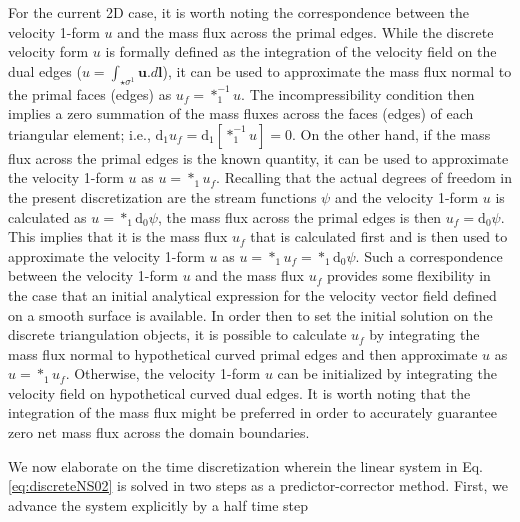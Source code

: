 \documentclass[final,12pt,times]{elsarticle}
\begin{document}
For the current 2D case, it is worth noting the correspondence between the velocity 1-form $u$ and the mass flux across the primal edges. While the discrete velocity form $u$ is formally defined as the integration of the velocity field on the dual edges ($u=\int_{\star \sigma^1} \mathbf{u} . d \mathbf{l}$), it can be used to approximate the mass flux normal to the primal faces (edges) as $u_f = \ast_1^{-1} u$. The incompressibility condition then implies a zero summation of the mass fluxes across the faces (edges) of each triangular element; i.e., $\textrm{d}_1 u_f = \textrm{d}_1 [\ast^{-1}_1 u ] = 0$. On the other hand, if the mass flux across the primal edges is the known quantity, it can be used to approximate the velocity 1-form $u$ as $u = \ast_1 u_f$. Recalling that the actual degrees of freedom in the present discretization are the stream functions $\psi$ and the velocity 1-form $u$ is calculated as $u = \ast_1 \textrm{d}_0 \psi$, the mass flux across the primal edges is then $u_f = \textrm{d}_0 \psi$. This implies that it is the mass flux $u_f$ that is calculated first and is then used to approximate the velocity 1-form $u$ as $u = \ast_1 u_f = \ast_1 \textrm{d}_0 \psi$. Such a correspondence between the velocity 1-form $u$ and the mass flux $u_f$ provides some flexibility in the case that an initial analytical expression for the velocity vector field defined on a smooth surface is available. In order then to set the initial solution on the discrete triangulation objects, it is possible to calculate $u_f$ by integrating the mass flux normal to hypothetical curved primal edges and then approximate $u$ as $u = \ast_1 u_f$. Otherwise, the velocity 1-form $u$ can be initialized by integrating the velocity field on hypothetical curved dual edges. It is worth noting that the integration of the mass flux might be preferred in order to accurately guarantee zero net mass flux across the domain boundaries.    

We now elaborate on the time discretization wherein the linear system in Eq. \eqref{eq:discreteNS02} is solved in two steps as a predictor-corrector method. First, we advance the system explicitly by a half time step
\end{document}
